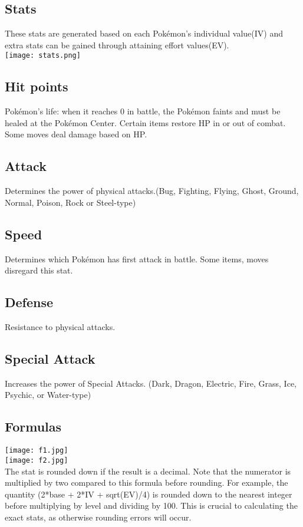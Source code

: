 \documentclass[11pt,fleqn]{book} %
\begin{document}
\subsection{Stats}
These stats are generated based on each Pokémon’s individual value(IV) and extra stats can be gained through attaining effort values(EV).\\
\texttt{[image: stats.png]}\\

\subsection{Hit points}
Pokémon’s life: when it reaches 0 in battle, the Pokémon faints and must be healed at the Pokémon Center. Certain items restore HP in or out of combat. Some moves deal damage based on HP.
\subsection{Attack}
Determines the power of physical attacks.(Bug, Fighting, Flying, Ghost, Ground, Normal, Poison, Rock or Steel-type)
\subsection{Speed}
Determines which Pokémon has first attack in battle. Some items, moves disregard this stat.
\subsection{Defense}
Resistance to physical attacks.
\subsection{Special Attack}
Increases the power of Special Attacks. (Dark, Dragon, Electric, Fire, Grass, Ice, Psychic, or Water-type)
\subsection{Formulas}
\texttt{[image: f1.jpg]}\\
\texttt{[image: f2.jpg]}\\
\indent The stat is rounded down if the result is a decimal. Note that the numerator is multiplied by two compared to this formula before rounding. For example, the quantity (2*base + 2*IV + sqrt(EV)/4) is rounded down to the nearest integer before multiplying by level and dividing by 100. This is crucial to calculating the exact stats, as otherwise rounding errors will occur.
\end{document}
